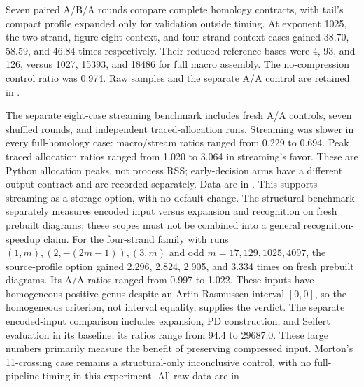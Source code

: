 Seven paired A/B/A rounds compare complete homology contracts, with tail's
compact profile expanded only for validation outside timing. At exponent
1025, the two-strand, figure-eight-context, and four-strand-context cases
gained 38.70, 58.59, and 46.84 times respectively. Their reduced reference
bases were 4, 93, and 126, versus 1027, 15393, and 18486 for full macro
assembly. The no-compression control ratio was 0.974. Raw samples and the
separate A/A control are retained in
.

The separate eight-case streaming benchmark includes fresh A/A controls,
seven shuffled rounds, and independent traced-allocation runs. Streaming
was slower in every full-homology case: macro/stream ratios ranged from
0.229 to 0.694. Peak traced allocation ratios ranged from 1.020 to 3.064
in streaming's favor. These are Python allocation peaks, not process RSS;
early-decision arms have a different output contract and are recorded
separately. Data are in
.
This supports streaming as a storage option, with no default change.
The structural benchmark separately measures encoded input versus expansion
and recognition on fresh prebuilt diagrams; these scopes must not be
combined into a general recognition-speedup claim.
For the four-strand family with runs $(1,m),(2,-(2m-1)),(3,m)$ and odd
$m=17,129,1025,4097$, the source-profile option gained 2.296, 2.824,
2.905, and 3.334 times on fresh prebuilt diagrams. Its A/A ratios ranged
from 0.997 to 1.022. These inputs have homogeneous positive genus despite
an Artin Rasmussen interval $[0,0]$, so the homogeneous criterion, not
interval equality, supplies the verdict. The separate encoded-input
comparison includes expansion, PD construction, and Seifert evaluation
in its baseline; its ratios range from 94.4 to 29687.0. These large numbers
primarily measure the benefit of preserving compressed input. Morton's
11-crossing case remains a structural-only inconclusive control, with no
full-pipeline timing in this experiment. All raw data are in
.
